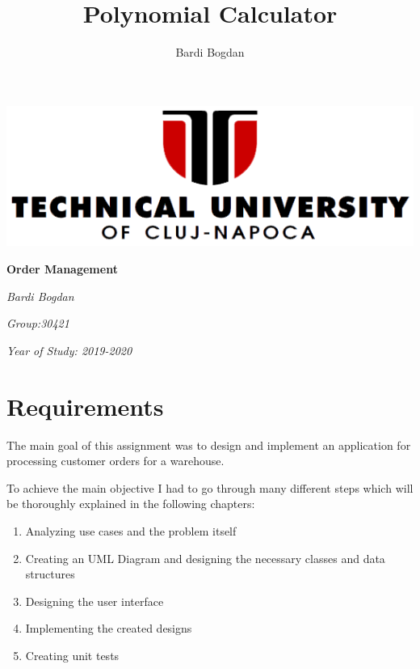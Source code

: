 \documentclass[10pt,a4paper]{article}
\author{Bardi Bogdan}
\title{Polynomial Calculator}
\begin{document}
\begin{titlepage}
\centering
\includegraphics[width=0.5\paperwidth]{utcn.png}\par\vspace{5cm}
	{\huge\bfseries Order Management\par}
	\vspace{2cm}
	{\Large\itshape Bardi Bogdan\par}
	{\Large\itshape Group:30421\par}
	{\Large\itshape Year of Study: 2019-2020\par}
	\vfill
\end{titlepage}
\tableofcontents
\pagebreak
\section{Requirements}
The main goal of this assignment was to design and implement an application for processing customer orders for a warehouse.\par
To achieve the main objective I had to go through many different steps which will be thoroughly explained in the following chapters:
\begin{enumerate}
\item Analyzing use cases and the problem itself
\item Creating an UML Diagram and designing the necessary classes and data structures
\item Designing the user interface
\item Implementing the created designs
\item Creating unit tests
\end{enumerate}
\end{document}
